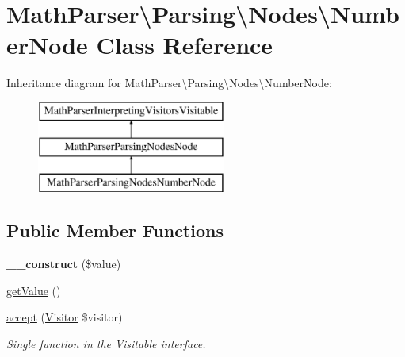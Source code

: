 \hypertarget{classMathParser_1_1Parsing_1_1Nodes_1_1NumberNode}{\section{Math\-Parser\textbackslash{}Parsing\textbackslash{}Nodes\textbackslash{}Number\-Node Class Reference}
\label{classMathParser_1_1Parsing_1_1Nodes_1_1NumberNode}
}
Inheritance diagram for Math\-Parser\textbackslash{}Parsing\textbackslash{}Nodes\textbackslash{}Number\-Node\-:\begin{figure}[H]
\begin{center}
\leavevmode
\includegraphics[height=3.000000cm]{classMathParser_1_1Parsing_1_1Nodes_1_1NumberNode}
\end{center}
\end{figure}
\subsection*{Public Member Functions}
\begin{DoxyCompactItemize}
\item 
\hypertarget{classMathParser_1_1Parsing_1_1Nodes_1_1NumberNode_abf2cc9dcf5655fcd73d6045a39008835}{{\bfseries \-\_\-\-\_\-construct} (\$value)}\label{classMathParser_1_1Parsing_1_1Nodes_1_1NumberNode_abf2cc9dcf5655fcd73d6045a39008835}

\item 
\hyperlink{classMathParser_1_1Parsing_1_1Nodes_1_1NumberNode_a9929ffd441d3753c1244be6667cd13fb}{get\-Value} ()
\item 
\hyperlink{classMathParser_1_1Parsing_1_1Nodes_1_1NumberNode_afe0acdb60d40d8f053a00cddef53a2d4}{accept} (\hyperlink{interfaceMathParser_1_1Interpreting_1_1Visitors_1_1Visitor}{Visitor} \$visitor)
\begin{DoxyCompactList}\small\item\em Single function in the Visitable interface. \end{DoxyCompactList}\end{DoxyCompactItemize}
